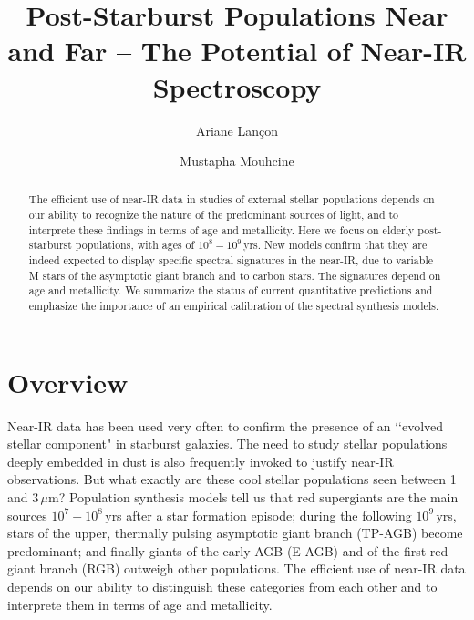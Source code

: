 \documentclass[runningheads]{svmult}
\begin{document}
%
\title*{Post-Starburst Populations Near and Far -- The Potential of Near-IR
Spectroscopy}
%
%
%
%
%
\author{Ariane Lan\c{c}on
\and Mustapha Mouhcine}
%
%
 
\maketitle              %
 
\begin{abstract}
The efficient use of near-IR data in studies of external stellar
populations depends on our ability to recognize the nature of the
predominant sources of light, and to interprete these findings in
terms of age and metallicity. Here we focus on elderly post-starburst
populations, with ages of $10^8 - 10^9$\,yrs. New models confirm
that they are indeed expected to display specific spectral signatures
in the near-IR,
due to variable M stars of the asymptotic giant branch and to 
carbon stars. The signatures depend on age and metallicity. 
We summarize the status of current quantitative predictions and
emphasize the importance of an empirical calibration of the spectral 
synthesis models.
\end{abstract}
 
 
\section{Overview} 

Near-IR data has been used very often to confirm the presence of an
\lq \lq evolved stellar component" in starburst galaxies. The need to
study stellar populations deeply embedded in dust is also frequently
invoked to justify near-IR observations. But what exactly are these cool
stellar populations seen between 1 and 3\,$\mu$m? Population
synthesis models tell us that red supergiants are the main sources
$10^7 - 10^8$\,yrs after a star formation episode; during the following
$10^9$\,yrs, stars of the upper, thermally pulsing asymptotic giant
branch (TP-AGB) become predominant; and finally giants of the early 
AGB (E-AGB) and of the first red giant branch (RGB) outweigh other
populations. The efficient use of near-IR data depends on our ability
to distinguish these categories from each other and to interprete
them in terms of age and metallicity. 
\end{document}
